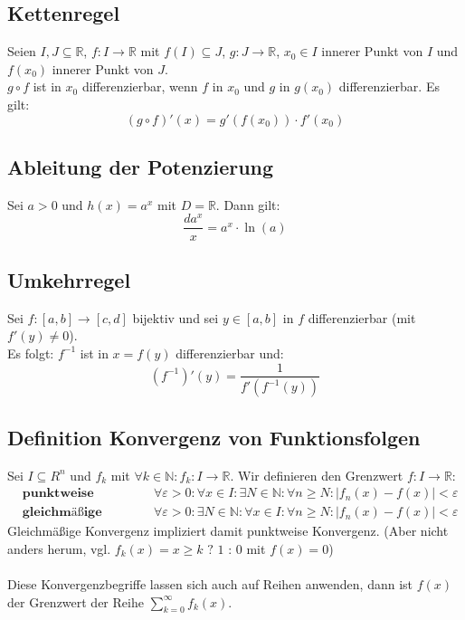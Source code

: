 \documentclass[halfparscip]{scrartcl}
\newcounter{subsection2}
\begin{document}
\subsection{Kettenregel}
Seien $I, J \subseteq \mathbb{R}$, $f: I \rightarrow \mathbb{R}$ mit $f(I) \subseteq J$, $g: J \rightarrow \mathbb{R}$, $x_0 \in I$ innerer Punkt von $I$ und $f(x_0)$ innerer Punkt von $J$.\\
$g \circ f$ ist in $x_0$ differenzierbar, wenn $f$ in $x_0$ und $g$ in $g(x_0)$ differenzierbar. Es gilt:
\begin{equation*}
	(g \circ f)'(x) = g'(f(x_0)) \cdot f'(x_0)
\end{equation*}

\subsection{Ableitung der Potenzierung}
Sei $a > 0$ und $h(x) = a^x$ mit $D = \mathbb{R}$. Dann gilt:
\begin{equation*}
	\frac{da^x}{x}=a^x\cdot \ln(a)
\end{equation*}

\addtocounter{subsection}{2}
\subsection{Umkehrregel}
Sei $f: [a, b] \rightarrow [c, d]$ bijektiv und sei $y \in [a, b]$ in $f$ differenzierbar (mit $f'(y) \neq 0$).\\
Es folgt: $f^{-1}$ ist in $x = f(y)$ differenzierbar und:
\begin{equation*}
	\left(f^{-1}\right)'(y) = \frac{1}{f'\left(f^{-1}(y)\right)}
\end{equation*}

\addtocounter{subsection}{3}
\subsection{Definition Konvergenz von Funktionsfolgen}
Sei $I \subseteq R^n$ und $f_k$ mit $\forall k \in \mathbb{N}: f_k: I \rightarrow \mathbb{R}$. Wir definieren den Grenzwert $f : I \rightarrow \mathbb{R}$:
\begin{align*}
	&\textbf{punktweise Konvergenz:} & &\forall \varepsilon > 0: \forall x \in I: \exists N \in \mathbb{N} : \forall n \geq N: \vert f_n(x)-f(x)\vert < \varepsilon\\
	&\textbf{gleichmäßige Konvergenz:} & &\forall \varepsilon > 0: \exists N \in \mathbb{N} : \forall x \in I: \forall n \geq N: \vert f_n(x)-f(x)\vert < \varepsilon
\end{align*}
Gleichmäßige Konvergenz impliziert damit punktweise Konvergenz. (Aber nicht anders herum, vgl. $f_k(x) = x \geq k \texttt{ ? } 1 \texttt{ : } 0$ mit $f(x) = 0$) \\\\
Diese Konvergenzbegriffe lassen sich auch auf Reihen anwenden, dann ist $f(x)$ der Grenzwert der Reihe $\sum\limits_{k=0}^\infty f_k(x)$.
\end{document}
